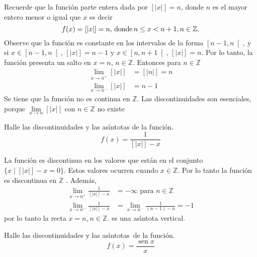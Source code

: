 \begin{sol}
Recuerde que la funci\'{o}n
%
parte entera dada por $\left[  \left\vert x\right\vert \right]  =n$, donde $n$
es el mayor entero menor o igual que $x$ es decir
\[
f(x)=\left[  \left\vert x\right\vert \right]  =n,\,\hbox{donde}\,n\leq
x<n+1,n\in\mathbb{Z}.
\]
Observe que la funci\'{o}n es constante en los intervalos de la forma $\left[
n-1,n\right[  ,\ $y si $x\in\left[  n-1,n\right[  $, $\left[  \left\vert
x\right\vert \right]  =n-1$ y $x\in\left[  n,n+1\right[  $, $\left[
\left\vert x\right\vert \right]  =n$. Por lo tanto, la funci\'{o}n presenta un
salto en $x=n$, $n\in\mathbb{Z}$. Entonces para $n\in\mathbb{Z}$%
\begin{align*}
\lim_{x\rightarrow n^{+}}\left[  \left\vert x\right\vert \right]   &  =\left[
\left\vert n\right\vert \right]  =n\\
\lim_{x\rightarrow n^{-}}\left[  \left\vert x\right\vert \right]   &  =n-1
\end{align*}
Se tiene que la funci\'{o}n no es continua en $\mathbb{Z}$. Las
discontinuidades son esenciales, porque $\lim\limits_{x\rightarrow n}\left[
\left\vert x\right\vert \right]  $ con $n\in\mathbb{Z}$ no existe
\end{sol}

\begin{example}
Halle las discontinuidades y las as\'{\i}ntotas de la funci\'{o}n.
\[
f(x)=\frac{1}{\left[  \left|  x\right|  \right]  -x}
\]

\end{example}

\begin{sol}
La funci\'{o}n es discontinua en los valores que est\'{a}n en el conjunto $\{
x \mid\left[  \left|  x\right|  \right]  -x=0 \}$. Estos valores ocurren
cuando $x\in\mathbb{Z}$. Por lo tanto la funci\'{o}n es discontinua en
$\mathbb{Z}$ . Adem\'{a}s,
\begin{align*}
\lim\limits_{x\rightarrow n^{+}}\frac{1}{\left[  \left|  x\right|  \right]
-x}  &  =-\infty\text{ para\ }n\in\mathbb{Z}\ \\
\lim\limits_{x\rightarrow n^{-}}\frac{1}{\left[  \left|  x\right|  \right]
-x}  &  =\lim\limits_{x\rightarrow n^{-}}\frac{1}{(n-1)-n}=-1
\end{align*}
por lo tanto la recta $x=n$,$\ n\in\mathbb{Z}$. es una as\'{\i}ntota vertical.
\end{sol}

\begin{example}
Halle las discontinuidades y las as\'{\i}ntotas\ de la funci\'{o}n.
\[
f(x)=\frac{\operatorname{sen}x}{x}%
\]

\end{example}

